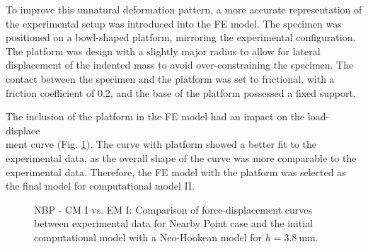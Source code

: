 To improve this unnatural deformation pattern, a more accurate representation of the 
experimental setup was introduced into the FE model. The specimen was positioned on a bowl-shaped
platform, mirroring the experimental configuration. The platform was design with a slightly major radius to allow 
for lateral displacement of the indented mass to avoid over-constraining the specimen. The contact 
between the specimen and the platform was set to frictional, with a friction coefficient of 0.2, and the base of the platform 
possessed a fixed support.

The inclusion of the platform in the FE model had an impact on the load-displace\\ment curve (Fig. \ref{fig:noplatformvsplatform}). 
The curve with platform showed a better fit to the experimental data, as the overall shape of the curve was more 
comparable to the experimental data. Therefore, the FE model with the platform was selected as the final model for computational 
model II.\\
\begin{figure}%
    \centering
   \quad
   \caption[CP II: No platform vs. with platform]{NBP - CM I vs. EM I: Comparison of force-displacement curves between experimental data for Nearby Point case and the initial computational model with a Neo-Hookean model for $h = \SI{3.8}{\milli \meter}$.}%
   \label{fig:noplatformvsplatform}%
\end{figure}

